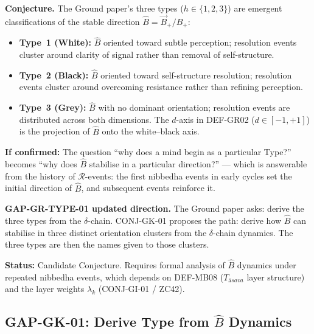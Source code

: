 \documentclass[12pt, a4paper]{article}
\providecommand{\Bplus}{B_{+}}
\providecommand{\Bvec}{\vec{B}_{+}}
\providecommand{\Tasava}{T_{\bar{\mathrm{a}}sava}}
\providecommand{\Tasava}{\mathcal{T}_{\!\mathrm{\bar{a}sava}}}
\begin{document}
\begin{formalbox}[title={CONJ-GK-01: Type $h$ as Emergent
  Orientation of $\hat{B}$ (Candidate)}]
\textbf{Conjecture.}
The Ground paper's three types ($h \in \{1,2,3\}$) are
emergent classifications of the stable direction
$\hat{B} = \Bvec/\Bplus$:

\begin{itemize}[leftmargin=*, itemsep=2pt]
\item \textbf{Type~1 (White):} $\hat{B}$ oriented toward
  subtle perception; resolution events cluster around
  clarity of signal rather than removal of self-structure.

\item \textbf{Type~2 (Black):} $\hat{B}$ oriented toward
  self-structure resolution; resolution events cluster
  around overcoming resistance rather than refining perception.

\item \textbf{Type~3 (Grey):} $\hat{B}$ with no dominant
  orientation; resolution events are distributed across
  both dimensions. The $d$-axis in DEF-GR02 ($d \in [-1,+1]$)
  is the projection of $\hat{B}$ onto the
  white--black axis.
\end{itemize}

\textbf{If confirmed:} The question ``why does a mind
begin as a particular Type?'' becomes ``why does $\hat{B}$
stabilise in a particular direction?'' --- which is
answerable from the history of $\mathcal{R}$-events:
the first nibbedha events in early cycles set the initial
direction of $\hat{B}$, and subsequent events reinforce it.

\textbf{GAP-GR-TYPE-01 updated direction.}
The Ground paper asks: derive the three types from the
$\delta$-chain. CONJ-GK-01 proposes the path: derive
how $\hat{B}$ can stabilise in three distinct orientation
clusters from the $\delta$-chain dynamics. The three
types are then the names given to those clusters.

\textbf{Status:} Candidate Conjecture.
Requires formal analysis of $\hat{B}$ dynamics under
repeated nibbedha events, which depends on DEF-MB08
($\Tasava$ layer structure) and the layer weights
$\lambda_k$ (CONJ-GI-01 / ZC42).
\end{formalbox}

\subsection{GAP-GK-01: Derive Type from \texorpdfstring{$\hat{B}$}{B} Dynamics}
\end{document}
